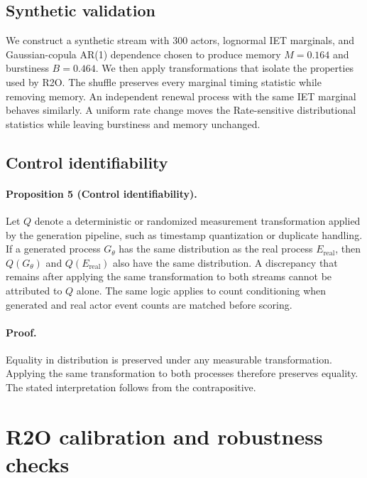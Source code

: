 \subsection{Synthetic validation}

We construct a synthetic stream with 300 actors, lognormal IET marginals, and
Gaussian-copula AR(1) dependence chosen to produce memory $M=0.164$ and
burstiness $B=0.464$. We then apply transformations that isolate the
properties used by R2O. The shuffle preserves every marginal timing statistic
while removing memory. An independent renewal process with the same IET
marginal behaves similarly. A uniform rate change moves the Rate-sensitive
distributional statistics while leaving burstiness and memory unchanged.



\subsection{Control identifiability}

\paragraph{Proposition 5 (Control identifiability).}
Let $Q$ denote a deterministic or randomized measurement transformation
applied by the generation pipeline, such as timestamp quantization or
duplicate handling. If a generated process $G_\theta$ has the same
distribution as the real process $E_{\mathrm{real}}$, then $Q(G_\theta)$ and
$Q(E_{\mathrm{real}})$ also have the same distribution. A discrepancy that
remains after applying the same transformation to both streams cannot be
attributed to $Q$ alone. The same logic applies to count conditioning when
generated and real actor event counts are matched before scoring.

\paragraph{Proof.}
Equality in distribution is preserved under any measurable transformation.
Applying the same transformation to both processes therefore preserves
equality. The stated interpretation follows from the contrapositive.


\section{R2O calibration and robustness checks}
\label{app:instrument}
\label{app:robustness}

